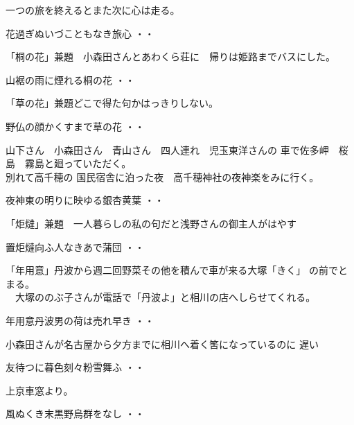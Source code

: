 \documentclass[b5paper]{tbook}
\begin{document}
\vspace{0.6cm}
一つの旅を終えるとまた次に心は走る。
\begin{shiika}花過ぎぬいづこともなき旅心
\hfill{・・}\end{shiika}
\vspace{0.6cm}
「桐の花」兼題　小森田さんとあわくら荘に　帰りは姫路までバスにした。
\begin{shiika}山裾の雨に煙れる桐の花
\hfill{・・}\end{shiika}
\vspace{0.6cm}
「草の花」兼題どこで得た句かはっきりしない。
\begin{shiika}野仏の顔かくすまで草の花
\hfill{・・}\end{shiika}
\vspace{0.6cm}
山下さん　小森田さん　青山さん　四人連れ　児玉東洋さんの
車で佐多岬　桜島　霧島と廻っていただく。\\別れて高千穂の
国民宿舎に泊った夜　高千穂神社の夜神楽をみに行く。
\begin{shiika}夜神東の明りに映ゆる銀杏黄葉
\hfill{・・}\end{shiika}
\vspace{0.6cm}
「炬燵」兼題　一人暮らしの私の句だと浅野さんの御主人がはやす
\begin{shiika}置炬燵向ふ人なきあで蒲団
\hfill{・・}\end{shiika}
\vspace{0.6cm}
「年用意」丹波から週二回野菜その他を積んで車が来る大塚「きく」
の前でとまる。\\　大塚ののぶ子さんが電話で「丹波よ」と相川の店へしらせてくれる。
\begin{shiika}年用意丹波男の荷は売れ早き
\hfill{・・}\end{shiika}
\vspace{0.6cm}
\vspace{0.6cm}
小森田さんが名古屋から夕方までに相川へ着く筈になっているのに
遅い
\begin{shiika}友待つに暮色刻々粉雪舞ふ
\hfill{・・}\end{shiika}
\vspace{0.6cm}
上京車窓より。
\begin{shiika}風ぬくき末黒野烏群をなし
\hfill{・・}\end{shiika}
\end{document}
